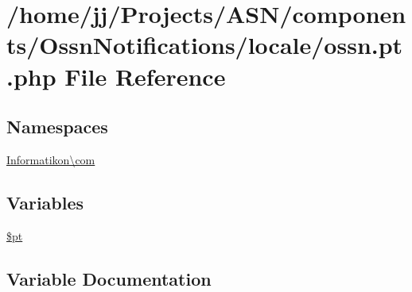 \hypertarget{components_2_ossn_notifications_2locale_2ossn_8pt_8php}{}\section{/home/jj/\+Projects/\+A\+S\+N/components/\+Ossn\+Notifications/locale/ossn.pt.\+php File Reference}
\label{components_2_ossn_notifications_2locale_2ossn_8pt_8php}
\subsection*{Namespaces}
\begin{DoxyCompactItemize}
\item 
 \hyperlink{namespace_informatikon_1_1com}{Informatikon\textbackslash{}com}
\end{DoxyCompactItemize}
\subsection*{Variables}
\begin{DoxyCompactItemize}
\item 
\hyperlink{components_2_ossn_notifications_2locale_2ossn_8pt_8php_a62c150775a7a00e8663463c638016cad}{\$pt}
\end{DoxyCompactItemize}


\subsection{Variable Documentation}
